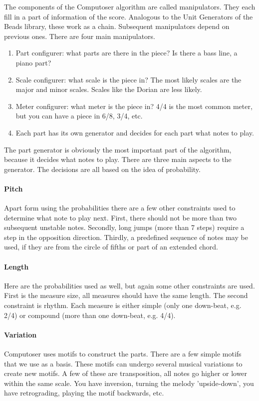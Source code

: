 \documentclass[12pt]{article}
\begin{document}
The components of the Computoser algorithm are called manipulators. They each fill in a part of information of the score. Analogous to the Unit Generators of the Beads library, these work as a chain. Subsequent manipulators depend on previous ones. There are four main manipulators.

\begin{enumerate}
\item Part configurer: what parts are there in the piece? Is there a bass line, a piano part?
\item Scale configurer: what scale is the piece in? The most likely scales are the major and minor scales. Scales like the Dorian are less likely.
\item Meter configurer: what meter is the piece in? 4/4 is the most common meter, but you can have a piece in 6/8, 3/4, etc.
\item Each part has its own generator and decides for each part what notes to play.
\end{enumerate}
 
The part generator is obviously the most important part of the algorithm, because it decides what notes to play. There are three main aspects to the generator. The decisions are all based on the idea of probability.

\paragraph{Pitch} Apart form using the probabilities there are a few other constraints used to determine what note to play next. First, there should not be more than two subsequent unstable notes. Secondly, long jumps (more than 7 steps) require a step in the opposition direction. Thirdly, a predefined sequence of notes may be used, if they are from the circle of fifths or part of an extended chord.

\paragraph{Length} Here are the probabilities used as well, but again some other constraints are used. First is the measure size, all measures should have the same length. The second constraint is rhythm. Each measure is either simple (only one down-beat, e.g. 2/4) or compound (more than one down-beat, e.g. 4/4).

\paragraph{Variation} Computoser uses motifs to construct the parts. There are a few simple motifs that we use as a basis. These motifs can undergo several musical variations to create new motifs. A few of these are transposition, all notes go higher or lower within the same scale. You have inversion, turning the melody 'upside-down', you have retrograding, playing the motif backwards, etc.
\newline
\end{document}
